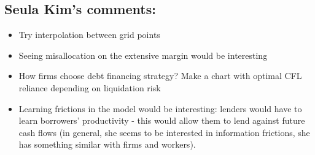 \documentclass[12pt]{article}
\begin{document}
\subsection*{Seula Kim's comments:} 
\begin{itemize} \setlength\itemsep{0em} \small
    \item Try interpolation between grid points 
    \item Seeing misallocation on the extensive margin would be interesting
    \item How firms choose debt financing strategy? Make a chart with optimal CFL reliance depending on liquidation risk
    \item Learning frictions in the model would be interesting: lenders would have to learn borrowers' productivity - this would allow them to lend against future cash flows (in general, she seems to be interested in information frictions, she has something similar with firms and workers). 
\end{itemize} \normalsize 
\end{document}
